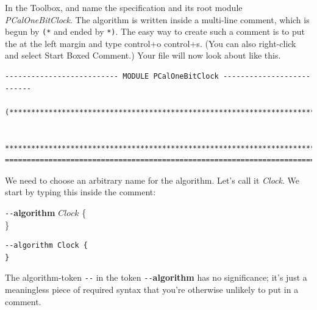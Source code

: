 \documentclass[fleqn,leqno]{article}
\begin{document}
In the Toolbox,  and name the
specification and its root module \emph{PCalOneBitClock}.  The
algorithm is written inside a 
multi-line comment, which is begun by
\verb|(*| and ended by \verb|*)|.  The easy way to create such a
comment is to put the 
   at the left margin and type
\textsf{control+o} \textsf{control+s}.  (You can also right-click and
select \textsf{Start Boxed Comment}.)  Your file will now look about
like this.
\begin{verbatim}
-------------------------- MODULE PCalOneBitClock --------------------------

(***************************************************************************

 ***************************************************************************)
=============================================================================
\end{verbatim}
We need to choose an arbitrary name for the algorithm.  Let's call it
\emph{Clock}.  We start by typing this inside the
   comment:%
\begin{display}
\begin{twocols}
\verb|--|\textbf{algorithm} $Clock$ \{\\
\}
\midcol
\begin{verbatim}
--algorithm Clock {
}
\end{verbatim}
\end{twocols}
\end{display}
The 
  {algorithm-token}%
\verb|--| in the token \verb|--|\textbf{algorithm} has no
significance; it's just a meaningless piece of required syntax that
you're otherwise unlikely to put in a comment.
\end{document}
